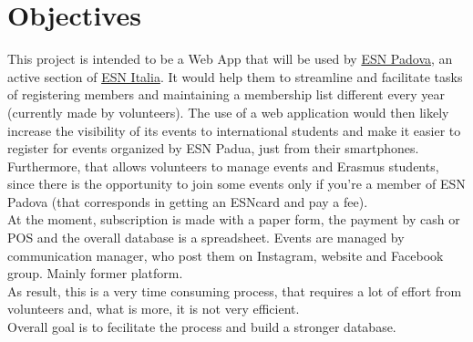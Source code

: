 \section{Objectives}

This project is intended to be a Web App that will be used by
\href{https://padova.esn.it/}{ESN Padova}, an active section of \href{https://esn.it/}{ESN Italia}.
It would help them to streamline and facilitate tasks of
registering members and maintaining a membership list different every year (currently made by volunteers).
The use of a web application would then likely increase the visibility of its events to international students
and make it easier to register for events organized by ESN Padua, just from their smartphones.\\
Furthermore, that allows volunteers to
manage events and Erasmus students, since there is the opportunity to join some events
only if you’re a member of ESN Padova (that corresponds in getting an ESNcard and pay a fee).\\
At the moment, subscription is made with a paper form, the payment by cash or POS and the overall database is a spreadsheet.
Events are managed by communication manager, who post them on Instagram, website and Facebook group. Mainly former platform.\\
As result, this is a very time consuming process, that requires a lot of effort from volunteers
and, what is more, it is not very efficient.\\
Overall goal is to fecilitate the process and build a stronger database.